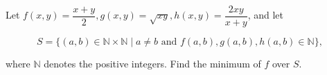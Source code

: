 Let $f(x, y) = \dfrac{x+y}{2}, g(x, y) = \sqrt{xy}, h(x, y) =
\dfrac{2xy}{x+y}$, and let

$$ S = \lbrace (a, b) \in \mathbb{N} \times \mathbb{N} \mid a \ne b \text{ and } f(a,b), g(a,b), h(a,b) \in \mathbb{N} \rbrace, $$

where $\mathbb{N}$ denotes the positive integers. Find the minimum of $f$ over
$S$.
